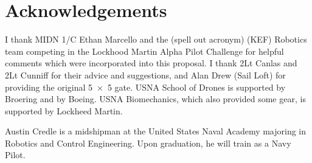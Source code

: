 \documentclass[onecolumn,10pt]{IEEEtran}
\newcommand{\myroot}{../}
\begin{document}
\section*{Acknowledgements}
I thank MIDN 1/C Ethan Marcello and the (spell out acronym) (KEF) Robotics team competing in the Lockhood Martin Alpha Pilot Challenge for helpful comments which were incorporated into this proposal. I thank 2Lt Canlas and 2Lt Cunniff for their advice and suggestions, and Alan Drew (Sail Loft) for providing the original \SI{5x5}{\foot} gate. USNA School of Drones is supported by Broering and by Boeing.  USNA Biomechanics, which also provided some gear, is supported by Lockheed Martin. 




\begin{IEEEbiography}{Austin Credle} is a midshipman at the United States Naval Academy majoring in Robotics and Control Engineering. Upon graduation, he will train as a Navy Pilot. 
\end{IEEEbiography}
%

%
\end{document}
